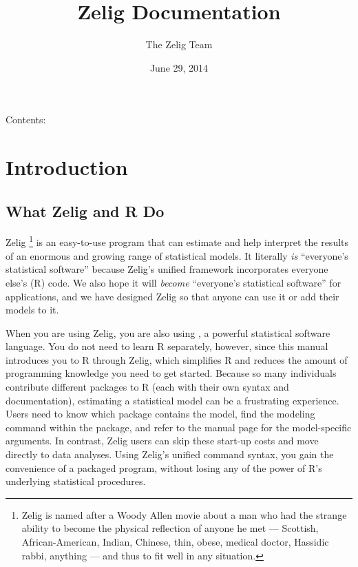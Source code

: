 \documentclass[letterpaper,10pt,english]{sphinxmanual}
\title{Zelig Documentation}
\date{June 29, 2014}
\author{The Zelig Team}
\begin{document}
\maketitle
\tableofcontents
{}\label{index::doc}


Contents:


\chapter{Introduction}
\label{1_introduction:introduction}\label{1_introduction:welcome-to-zelig-s-documentation}\label{1_introduction::doc}

\section{What Zelig and R Do}
\label{1_introduction:what-zelig-and-r-do}
Zelig \footnote{
Zelig is named after a Woody Allen movie about a man who had the
strange ability to become the physical reflection of anyone he met —
Scottish, African-American, Indian, Chinese, thin, obese, medical
doctor, Hassidic rabbi, anything — and thus to fit well in any
situation.
} is an easy-to-use program that can estimate and help
interpret the results of an enormous and growing range of statistical
models. It literally \emph{is} “everyone’s statistical software” because
Zelig’s unified framework incorporates everyone else’s (R) code. We also
hope it will \emph{become} “everyone’s statistical software” for
applications, and we have designed Zelig so that anyone can use it or
add their models to it.

When you are using Zelig, you are also using , a powerful statistical
software language. You do not need to learn R separately, however, since
this manual introduces you to R through Zelig, which simplifies R and
reduces the amount of programming knowledge you need to get started.
Because so many individuals contribute different packages to R (each
with their own syntax and documentation), estimating a statistical model
can be a frustrating experience. Users need to know which package
contains the model, find the modeling command within the package, and
refer to the manual page for the model-specific arguments. In contrast,
Zelig users can skip these start-up costs and move directly to data
analyses. Using Zelig’s unified command syntax, you gain the convenience
of a packaged program, without losing any of the power of R’s underlying
statistical procedures.
\end{document}
